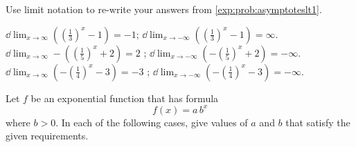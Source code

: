 \begin{exercises}
\begin{problem}
\begin{subproblem}
	Use limit notation to re-write your answers from \cref{exp:prob:asymptoteslt1}.
	\begin{shortsolution}
		$\dd\lim_{x\to\infty}\left(\left(\frac{1}{3}\right)^x-1\right) =  -1$;  $\dd\lim_{x\to-\infty}\left(\left(\frac{1}{3}\right)^x-1\right) = \infty$.\\
		$\dd\lim_{x\to\infty}-\left(\left(\frac{1}{5}\right)^x+2\right)=  2$ ;  $\dd\lim_{x\to-\infty}\left(-\left(\frac{1}{5}\right)^x+2\right)= -\infty$.\\
		$\dd\lim_{x\to\infty}\left(-\left(\frac{1}{4}\right)^x-3\right)=-3$  ;  $\dd\lim_{x\to-\infty}\left(-\left(\frac{1}{4}\right)^x-3\right)= -\infty$.
	\end{shortsolution}
\end{subproblem}
\end{problem}
\begin{problem}
Let $f$ be an exponential function that has formula
\[
	f(x) = a\,b^x
\]
where $b>0$. In each of the following cases, give values of $a$ and $b$ that satisfy the given requirements.


\end{problem}
\end{exercises}

